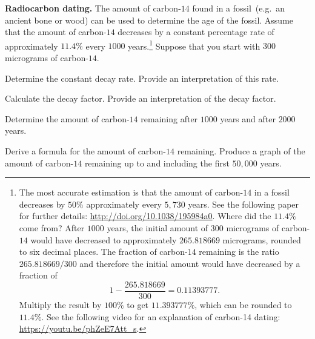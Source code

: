 \documentclass[a4paper,oneside,12pt]{article}
\begin{document}
\begin{example}
\label{eg:radiocarbon_dating}
\textbf{Radiocarbon dating.}
The amount of carbon-$14$ found in a fossil~(e.g.~an ancient bone or
wood) can be used to determine the age of the fossil.  Assume that the
amount of carbon-$14$ decreases by a constant percentage rate of
approximately $11.4\%$ every $1000$ years.\footnote{
  The most accurate estimation is that the amount of carbon-$14$ in a
  fossil decreases by $50\%$ approximately every $5,730$ years.  See
  the following paper for further details:
  \url{http://doi.org/10.1038/195984a0}.  Where did the $11.4\%$ come
  from?  After $1000$ years, the initial amount of $300$ micrograms of
  carbon-$14$ would have decreased to approximately $265.818669$
  micrograms, rounded to six decimal places.  The fraction of
  carbon-$14$ remaining is the ratio $265.818669 / 300$ and therefore
  the initial amount would have decreased by a fraction of
  \[
  1 - \frac{265.818669}{300}
  =
  0.11393777.
  \]
  Multiply the result by $100\%$ to get $11.393777\%$, which can be
  rounded to $11.4\%$.  See the following video for an explanation of
  carbon-14 dating: \url{https://youtu.be/phZeE7Att_s}.
}
Suppose that you start with $300$ micrograms of carbon-$14$.
\begin{packedenum}
\item\label{subeg:carbon14_decay_rate}
  Determine the constant decay rate.  Provide an interpretation of
  this rate.

\item\label{subeg:carbon14_decay_factor}
  Calculate the decay factor.  Provide an interpretation of the decay
  factor.

\item\label{subeg:carbon14_after_1000_and_2000_years}
  Determine the amount of carbon-$14$ remaining after $1000$ years and
  after $2000$ years.

\item\label{subeg:carbon14_formula_graph}
  Derive a formula for the amount of carbon-$14$ remaining.  Produce a
  graph of the amount of carbon-$14$ remaining up to and including the
  first $50,000$ years.
\end{packedenum}
\end{example}
\end{document}
